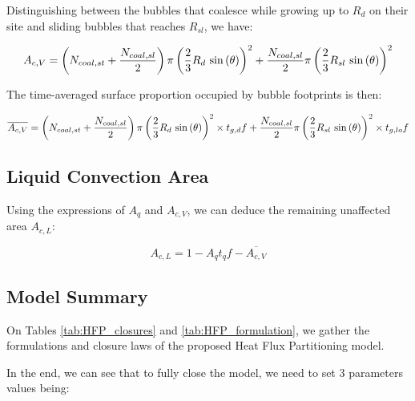 Distinguishing between the bubbles that coalesce while growing up to $R_{d}$ on their site and sliding bubbles that reaches $R_{sl}$, we have:

\begin{equation}
A_{c,V} = \parth{N_{coal,st} + \dfrac{N_{coal,sl}}{2}}\pi \parth{\dfrac{2}{3}R_{d}\ \sin{\theta}}^{2} + \dfrac{N_{coal,sl}}{2}\pi \parth{\dfrac{2}{3}R_{sl}\ \sin{\theta}}^{2}
\end{equation}

The time-averaged surface proportion occupied by bubble footprints is then:

\begin{equation}
\overline{A_{c,V}} =  \parth{N_{coal,st} + \dfrac{N_{coal,sl}}{2}}\pi \parth{\dfrac{2}{3}R_{d}\ \sin{\theta}}^{2} \times t_{g,d}f + \dfrac{N_{coal,sl}}{2}\pi \parth{\dfrac{2}{3}R_{sl}\ \sin{\theta}}^{2} \times t_{g,lo} f
\end{equation}


\subsection{Liquid Convection Area}

Using the expressions of $A_{q}$ and $A_{c,V}$, we can deduce the remaining unaffected area $A_{c,L}$:

\begin{equation}
A_{c,L} = 1 - A_{q}t_{q}f - \overline{A_{c,V}}
\end{equation}

\subsection{Model Summary}

On Tables \ref{tab:HFP_closures} and \ref{tab:HFP_formulation}, we gather the formulations and closure laws of the proposed Heat Flux Partitioning model.

\npar


In the end, we can see that to fully close the model, we need to set 3 parameters values being:

